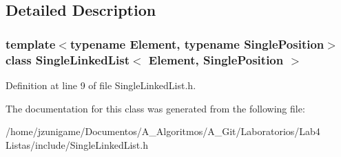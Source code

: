 \subsection{Detailed Description}
\subsubsection*{template$<$typename Element, typename Single\+Position$>$\newline
class Single\+Linked\+List$<$ Element, Single\+Position $>$}



Definition at line 9 of file Single\+Linked\+List.\+h.



The documentation for this class was generated from the following file\+:\begin{DoxyCompactItemize}
\item 
/home/jzunigame/\+Documentos/\+A\+\_\+\+Algoritmos/\+A\+\_\+\+Git/\+Laboratorios/\+Lab4 Listas/include/Single\+Linked\+List.\+h\end{DoxyCompactItemize}
